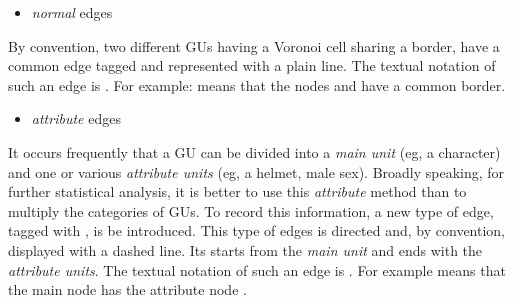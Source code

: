 \documentclass[article]{jss}\usepackage{knitr}
\begin{document}
\begin{itemize}
  \item \emph{normal} edges
\end{itemize}

By convention, two different GUs having a Voronoi cell sharing a border, have a common edge tagged  and represented with a plain line. The textual notation of such an edge is . For example:  means that the nodes  and  have a common border.

\begin{itemize}
  \item \emph{attribute} edges
\end{itemize}

It occurs frequently that a GU can be divided into a \emph{main unit} (eg, a character) and one or various \emph{attribute units} (eg, a helmet, male sex). Broadly speaking, for further statistical analysis, it is better to use this \emph{attribute} method than to multiply the categories of GUs. To record this information, a new type of edge, tagged with , is be introduced. This type of edges is directed and, by convention, displayed with a dashed line. Its starts from the \emph{main unit} and ends with the \emph{attribute units}. The textual notation of such an edge is . For example  means that the main node  has the attribute node .
\end{document}
